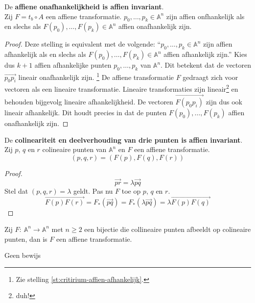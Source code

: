 \documentclass[main.tex]{subfiles}
\begin{document}
\begin{st}
  De \textbf{affiene onafhankelijkheid is affien invariant}.\\
  Zij $F = t_{b} \circ A$ een affiene transformatie.
  $p_{0},\dotsc,p_{k} \in \mathbb{A}^{n}$ zijn affien onfhankelijk als en slechs als $F(p_{0}),\dotsc,F(p_{k}) \in \mathbb{A}^{n}$ affien onafhankelijk zijn.

  \begin{proof}
     Deze stelling is equivalent met de volgende: ``$p_{0},\dotsc,p_{k} \in \mathbb{A}^{n}$ zijn affien afhankelijk als en slechs als $F(p_{0}),\dotsc,F(p_{k}) \in \mathbb{A}^{n}$ affien afhankelijk zijn.''
     Kies dus $k+1$ affien afhankelijke punten $p_{0},\dotsc,p_{k}$ van $\mathbb{A}^{n}$.
     Dit betekent dat de vectoren $\overrightarrow{p_{0}p_{i}}$ lineair onafhankelijk zijn. \footnote{Zie stelling \ref{st:critirium-affien-afhankelijk}.}
     De affiene transformatie $F$ gedraagt zich voor vectoren als een lineaire transformatie.
     Lineaire transformaties zijn lineair\footnote{duh!} en behouden bijgevolg lineaire afhankelijkheid.
     De vectoren $\overrightarrow{F(p_{0}p_{i})}$ zijn dus ook lineair afhankelijk.
     Dit houdt precies in dat de punten $F(p_{0}),\dotsc,F(p_{k})$ affien onafhankelijk zijn.
  \end{proof}
\end{st}

\begin{st}
  \label{st:colineariteit-affien-invariant}
  De \textbf{colineariteit en deelverhouding van drie punten is affien invariant}.\\
  Zij $p$, $q$ en $r$ colineaire punten van $\mathbb{A}^{n}$ en $F$ een affiene transformatie.
  \[ (p,q,r) = (F(p),F(q),F(r)) \]

  \begin{proof}
     \[ \overrightarrow{pr} = \lambda\overrightarrow{pq} \]
     Stel dat $(p,q,r)= \lambda$ geldt. Pas nu $F$ toe op $p$, $q$ en $r$.
     \[ \overrightarrow{F(p)F(r)} = F_{*}(\overrightarrow{pq}) = F_{*}(\lambda\overrightarrow{pq}) = \lambda\overrightarrow{F(p)F(q)} \]
  \end{proof}
\end{st}

\begin{st}
  Zij $F:\ \mathbb{A}^{n} \rightarrow \mathbb{A}^{n}$ met $n\ge 2$ een bijectie die collineaire punten afbeeldt op colineaire punten, dan is $F$ een affiene transformatie.

Geen bewijs
\end{st}
\end{document}
